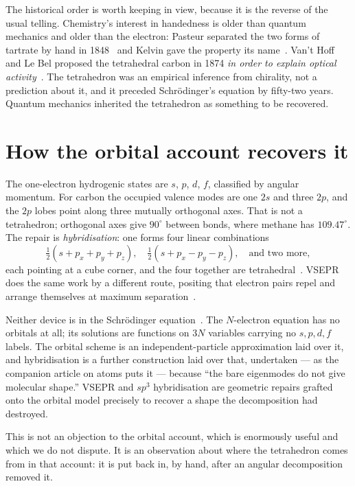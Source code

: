 \documentclass[11pt]{article}
\begin{document}
The historical order is worth keeping in view, because it is the reverse of the usual telling.
Chemistry's interest in handedness is older than quantum mechanics and older than the electron:
Pasteur separated the two forms of tartrate by hand in 1848~\cite{Pasteur1848} and Kelvin gave the
property its name~\cite{Kelvin1904}. Van't Hoff and Le Bel proposed the tetrahedral carbon in 1874
\emph{in order to explain optical activity}~\cite{vantHoff1874,LeBel1874}. The tetrahedron was an empirical inference from chirality, not a prediction about it,
and it preceded Schr\"odinger's equation by fifty-two years. Quantum mechanics inherited the
tetrahedron as something to be recovered.

\section{How the orbital account recovers it}

The one-electron hydrogenic states are $s$, $p$, $d$, $f$, classified by angular momentum. For
carbon the occupied valence modes are one $2s$ and three $2p$, and the $2p$ lobes point along three
mutually orthogonal axes. That is not a tetrahedron; orthogonal axes give $90^\circ$ between
bonds, where methane has $109.47^\circ$. The repair is \emph{hybridisation}: one forms four linear
combinations
\[
\tfrac12\left(s + p_x + p_y + p_z\right), \quad
\tfrac12\left(s + p_x - p_y - p_z\right), \quad \text{and two more},
\]
each pointing at a cube corner, and the four together are tetrahedral~\cite{Pauling1931}. VSEPR
does the same work by a different route, positing that electron pairs repel and arrange themselves
at maximum separation~\cite{GillespieNyholm1957}.

Neither device is in the Schr\"odinger equation~\cite{Schrodinger1926}. The $N$-electron equation has no orbitals at all;
its solutions are functions on $3N$ variables carrying no $s,p,d,f$ labels. The orbital scheme is
an independent-particle approximation laid over it, and hybridisation is a further construction
laid over that, undertaken --- as the companion article on atoms puts it --- because ``the bare
eigenmodes do not give molecular shape.'' VSEPR and $sp^3$ hybridisation are geometric repairs
grafted onto the orbital model precisely to recover a shape the decomposition had destroyed.

This is not an objection to the orbital account, which is enormously useful and which we do not
dispute. It is an observation about where the tetrahedron comes from in that account: it is put
back in, by hand, after an angular decomposition removed it.
\end{document}
